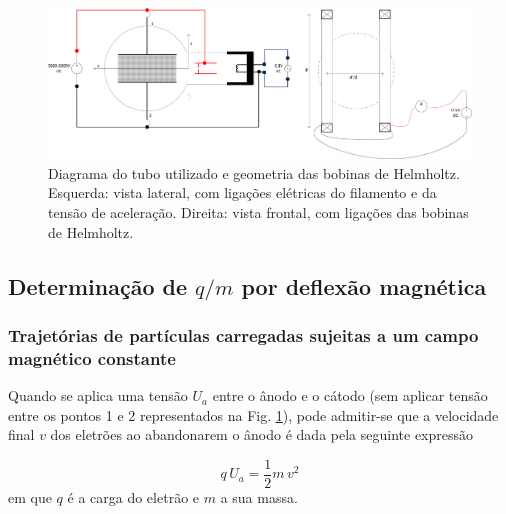 \documentclass[12pt,a4paper,oneside]{paper}
\begin{document}
\begin{figure}[H]
	[h]  \centering 
	\includegraphics[width=1\textwidth]{thomson_images/fig5-TuboTL.png} 
	\caption{Diagrama do tubo utilizado e geometria das bobinas de Helmholtz. Esquerda: vista lateral, com ligações
    elétricas do filamento e da tensão de aceleração. Direita: vista frontal, com ligações das bobinas de Helmholtz. \label{fig:TL}} 
\end{figure}

\subsection{\sf Determinação de $q/m$ por deflexão magnética}
\subsubsection{\sf Trajetórias de partículas carregadas sujeitas a um campo magnético constante}
Quando se aplica uma tensão $U_a$ entre o ânodo e o cátodo (sem aplicar tensão entre os pontos 1 e 2 representados na Fig.
\ref{fig:TL}), pode admitir-se que a velocidade final $v$ dos eletrões ao abandonarem o ânodo é dada pela seguinte expressão 

\begin{equation}
	\label{eq:encin11}
q\, U_a = \frac{1}{2} m \, v^2
\end{equation}
em que $q$  é a carga do eletrão e $m$ a sua massa.
\end{document}
